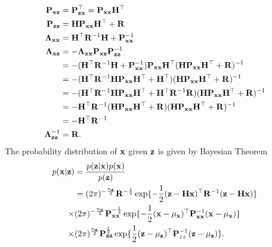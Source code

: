 \begin{equation}
\begin{split}
{\bf P}_{\bf xz}&={\bf P}_{\bf zx}^\top={\bf P}_{\bf xx}{\bf H}^\top \\
{\bf P}_{\bf zz}&={\bf H}{\bf P}_{\bf xx}{\bf H}^\top+{\bf R} \\
        {\bf \Lambda}_{\bf xx}&={\bf H}^\top{\bf R}^{-1}{\bf H}+{\bf P}_{\bf xx}^{-1}\\
        {\bf \Lambda}_{\bf xz}&=-{\bf \Lambda}_{\bf xx}{\bf P}_{\bf xz}{\bf P}_{\bf zz}^{-1}\\
        &=-({\bf H}^\top{\bf R}^{-1}{\bf H}+{\bf P}_{\bf xx}^{-1}){\bf P}_{\bf xx}{\bf H}^\top({\bf H}{\bf P}_{\bf xx}{\bf H}^\top+{\bf R})^{-1} \\
        &=-({\bf H}^\top{\bf R}^{-1}{\bf H}{\bf P}_{\bf xx}{\bf H}^\top+{\bf H}^\top)({\bf H}{\bf P}_{\bf xx}{\bf H}^\top+{\bf R})^{-1} \\
         &=-({\bf H}^\top{\bf R}^{-1}{\bf H}{\bf P}_{\bf xx}{\bf H}^\top+{\bf H}^\top{\bf R}^{-1}{\bf R})({\bf H}{\bf P}_{\bf xx}{\bf H}^\top+{\bf R})^{-1} \\
          &=-{\bf H}^\top{\bf R}^{-1}({\bf H}{\bf P}_{\bf xx}{\bf H}^\top+{\bf R})({\bf H}{\bf P}_{\bf xx}{\bf H}^\top+{\bf R})^{-1} \\
        &=-{\bf H}^\top{\bf R}^{-1}\\
        {\bf \Lambda}_{\bf zz}^{-1}&=\bf R.\\
\end{split}
\end{equation}
The probability distribution of $\bf x$ given $\bf z$ is given by Bayesian Theorem
\begin{equation}
\begin{split}
\label{eq:pxz}
p({\bf x}|{\bf z})&=\frac{p({\bf z}|{\bf x})p({\bf x})}{p({\bf z})} \\
&=(2\pi)^{-\frac{n_{\bf z}}{2}}{\bf R}^{-\frac{1}{2}}\exp\{-\frac{1}{2}({\bf z}-{\bf H}{\bf x})^\top
{\bf R}^{-1}({\bf z}-{\bf H}{\bf x})\}\\
\times&(2\pi)^{-\frac{n_{\bf x}}{2}}{\bf P}_{\bf xx}^{-\frac{1}{2}}\exp\{-\frac{1}{2}({\bf x}-\mu_{\bf x})^\top
{\bf P}_{\bf xx}^{-1}({\bf x}-\mu_{\bf x})\} \\
\times&(2\pi)^{\frac{n_{\bf z}}{2}}{\bf P}_{\bf zz}^{\frac{1}{2}}\exp\{\frac{1}{2}({\bf z}-\mu_{\bf z})^\top
{\bf P}_{zz}^{-1}({\bf z}-\mu_{\bf z})\}. \\
\end{split}
\end{equation}
